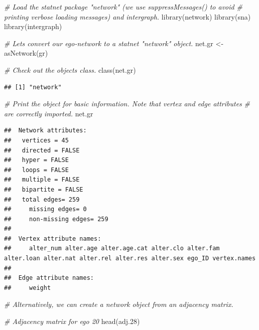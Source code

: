 \documentclass[
]{book}
\newenvironment{Shaded}{\begin{snugshade}}{\end{snugshade}}
\newcommand{\CommentTok}[1]{\textcolor[rgb]{0.56,0.35,0.01}{\textit{#1}}}
\newcommand{\FloatTok}[1]{\textcolor[rgb]{0.00,0.00,0.81}{#1}}
\newcommand{\FunctionTok}[1]{\textcolor[rgb]{0.00,0.00,0.00}{#1}}
\newcommand{\NormalTok}[1]{#1}
\newcommand{\OtherTok}[1]{\textcolor[rgb]{0.56,0.35,0.01}{#1}}
\begin{document}
\begin{Shaded}
\begin{Highlighting}[]
\CommentTok{\# Load the statnet package "network" (we use suppressMessages() to avoid}
\CommentTok{\# printing verbose loading messages) and intergraph.}
\FunctionTok{library}\NormalTok{(network)}
\FunctionTok{library}\NormalTok{(sna)}
\FunctionTok{library}\NormalTok{(intergraph)}

\CommentTok{\# Let\textquotesingle{}s convert our ego{-}network to a statnet "network" object.}
\NormalTok{net.gr }\OtherTok{\textless{}{-}} \FunctionTok{asNetwork}\NormalTok{(gr)}

\CommentTok{\# Check out the object\textquotesingle{}s class.}
\FunctionTok{class}\NormalTok{(net.gr)}
\end{Highlighting}
\end{Shaded}

\begin{verbatim}
## [1] "network"
\end{verbatim}

\begin{Shaded}
\begin{Highlighting}[]
\CommentTok{\# Print the object for basic information. Note that vertex and edge attributes}
\CommentTok{\# are correctly imported.}
\NormalTok{net.gr}
\end{Highlighting}
\end{Shaded}

\begin{verbatim}
##  Network attributes:
##   vertices = 45 
##   directed = FALSE 
##   hyper = FALSE 
##   loops = FALSE 
##   multiple = FALSE 
##   bipartite = FALSE 
##   total edges= 259 
##     missing edges= 0 
##     non-missing edges= 259 
## 
##  Vertex attribute names: 
##     alter_num alter.age alter.age.cat alter.clo alter.fam alter.loan alter.nat alter.rel alter.res alter.sex ego_ID vertex.names 
## 
##  Edge attribute names: 
##     weight
\end{verbatim}

\begin{Shaded}
\begin{Highlighting}[]
\CommentTok{\# Alternatively, we can create a network object from an adjacency matrix.}

\CommentTok{\# Adjacency matrix for ego 20}
\FunctionTok{head}\NormalTok{(adj}\FloatTok{.28}\NormalTok{)}
\end{Highlighting}
\end{Shaded}
\end{document}
